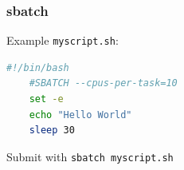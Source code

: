 \documentclass{beamer}
\newcommand{\code}[1]{\colorbox{codegray}{\texttt{#1}}}
\begin{document}
%




\begin{frame}[fragile]
\frametitle{sbatch}
Example \code{myscript.sh}: 
\begin{lstlisting}[backgroundcolor = \color{codegray}, language = Bash, showstringspaces=false]
    #!/bin/bash
    #SBATCH --cpus-per-task=10
    set -e
    echo "Hello World"
    sleep 30
\end{lstlisting}
\bigskip
\bigskip
Submit with \code{sbatch myscript.sh}
\end{frame}
\end{document}
